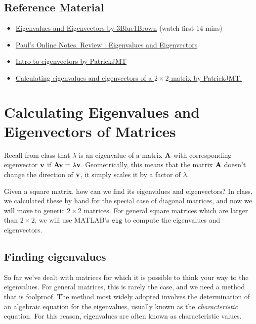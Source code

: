 \subsection{Reference Material}

\begin{itemize}
\item \href{https://www.youtube.com/watch?v=PFDu9oVAE-g}{Eigenvalues and Eigenvectors by 3Blue1Brown} (watch first 14 mins)
\item \href{http://tutorial.math.lamar.edu/Classes/DE/LA_Eigen.aspx}{Paul's Online Notes. Review : Eigenvalues and Eigenvectors}
\item \href{https://www.youtube.com/watch?v=G4N8vJpf7hM}{Intro to eigenvectors by PatrickJMT}
\item \href{https://www.youtube.com/watch?v=IdsV0RaC9jM}{Calculating eigenvalues and eigenvectors of a $2\times 2$ matrix by PatrickJMT.}
\end{itemize}

\section{Calculating Eigenvalues and Eigenvectors of Matrices }

Recall from class that $\lambda$ is an eigenvalue of a matrix $\mathbf{A}$ with corresponding eigenvector $\mathbf{v}$ if $\mathbf{A}\mathbf{v}=\lambda\mathbf{v}$. Geometrically, this means that the matrix $\mathbf{A}$ doesn't change the direction of $\mathbf{v}$, it simply scales it by a factor of $\lambda$.

Given a square matrix, how can we find its eigenvalues and eigenvectors? In class, we calculated these by hand for the special case of diagonal matrices, and now we will move to generic $2\times 2$ matrices. For general square matrices which are larger than $2\times 2$, we will use MATLAB's $\texttt{eig}$  to compute the eigenvalues and eigenvectors.

\subsection{Finding eigenvalues}

So far we've dealt with matrices for which it is possible to think your way to the eigenvalues. For general matrices, this is rarely the case, and we need a method that is foolproof. The method most widely adopted involves the determination of an algebraic equation for the eigenvalues, usually known as the \textit{characteristic} equation. For this reason, eigenvalues are often known as characteristic values. 


